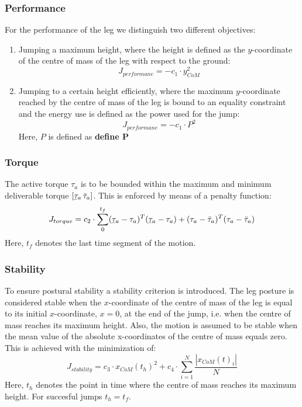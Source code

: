 \documentclass[letterpaper, 10 pt, conference]{ieeeconf}  %
\newcommand\ubar[1]{%
	\underaccent{\bar}{#1}}
\begin{document}
\subsubsection{Performance}
For the performance of the leg we distinguish two different objectives: 
\begin{enumerate}
	\item Jumping a maximum height, where the height is defined as the $y$-coordinate of the centre of mass of the leg with respect to the ground:
 \begin{equation}
	J_{performane} = -c_1 \cdot y_{CoM}^2
 \end{equation}
	\item Jumping to a certain height efficiently, where the maximum $y$-coordinate reached by the centre of mass of the leg is bound to an equality constraint and the energy use is defined as the power used for the jump:
 \begin{equation}
	J_{performane} = - c_1 \cdot P^2
 \end{equation}
	Here, $P$ is defined as \textbf{define P}
\end{enumerate}

\subsubsection{Torque}
The active torque $\tau_a$ is to be bounded within the maximum and minimum deliverable torque $ [\ubar \tau_{a} \, \bar \tau_{a}]$. This is enforced by means of a penalty function:  
 \begin{equation}
J_{torque}= c_2 \cdot \sum_{0}^{t_f} (\ubar \tau_{a}-\tau_a)^T (\ubar \tau_{a}-\tau_a) + (\tau_a - \bar \tau_{a})^T (\tau_a - \bar \tau_{a})
 \end{equation}
Here, $t_f$ denotes the last time segment of the motion.\\

\subsubsection{Stability}
To ensure postural stability a stability criterion is introduced. The leg posture is considered stable when the $x$-coordinate of the centre of mass of the leg is equal to its initial $x$-coordinate, $x=0$, at the end of the jump, i.e. when the centre of mass reaches its maximum height. Also, the motion is assumed to be stable when the mean value of the absolute x-coordinates of the centre of mass equals zero. This is achieved with the minimization of:
 \begin{equation}
J_{stability}  = c_3\cdot x_{CoM}(t_h)^2 + c_4\cdot  \sum^{N}_{i=1}\frac{| x_{CoM}(t)_i |}{N}
 \end{equation}
Here, $t_h$ denotes the point in time where the centre of mass reaches its maximum height. For succesful jumps $t_h=t_f$.\\
\end{document}
